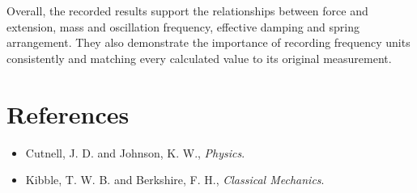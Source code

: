 \documentclass[12pt,a4paper]{article}
\begin{document}
Overall, the recorded results support the relationships between force and extension, mass and oscillation frequency, effective damping and spring arrangement. They also demonstrate the importance of recording frequency units consistently and matching every calculated value to its original measurement.

\section{References}

\begin{itemize}
    \item Cutnell, J. D. and Johnson, K. W., \textit{Physics}.
    \item Kibble, T. W. B. and Berkshire, F. H., \textit{Classical Mechanics}.
\end{itemize}
\end{document}
